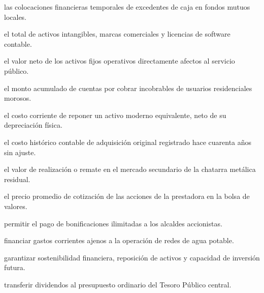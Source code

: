 \begin{opts}
    \item las colocaciones financieras temporales de excedentes de caja en fondos mutuos locales.
    \item el total de activos intangibles, marcas comerciales y licencias de software contable.
    \item el valor neto de los activos fijos operativos directamente afectos al servicio público.
    \item el monto acumulado de cuentas por cobrar incobrables de usuarios residenciales morosos.
\end{opts}

\begin{opts}
    \item el costo corriente de reponer un activo moderno equivalente, neto de su depreciación física.
    \item el costo histórico contable de adquisición original registrado hace cuarenta años sin ajuste.
    \item el valor de realización o remate en el mercado secundario de la chatarra metálica residual.
    \item el precio promedio de cotización de las acciones de la prestadora en la bolsa de valores.
\end{opts}

\begin{opts}
    \item permitir el pago de bonificaciones ilimitadas a los alcaldes accionistas.
    \item financiar gastos corrientes ajenos a la operación de redes de agua potable.
    \item garantizar sostenibilidad financiera, reposición de activos y capacidad de inversión futura.
    \item transferir dividendos al presupuesto ordinario del Tesoro Público central.
\end{opts}

